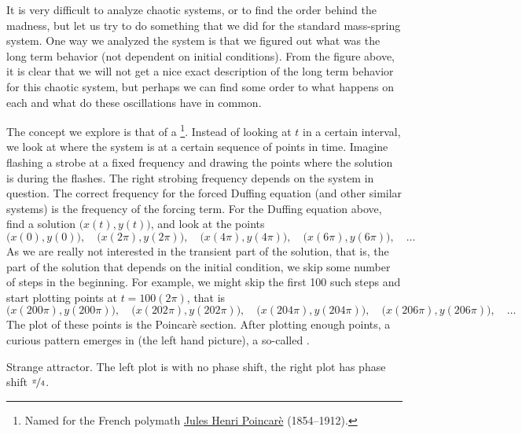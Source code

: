 It is very difficult to analyze chaotic systems, or to find the
order behind the madness, but let us try to do something that we did for
the standard mass-spring system.  One way we analyzed
the system is that we figured out what was the long term behavior (not
dependent on initial conditions).  From the figure above, it is clear
that we will not get a nice exact description of the long term behavior
for this chaotic system, but
perhaps we can find some order to what happens on each
and what do these oscillations have in common.

The concept we explore
is that of a \emph{}%
\footnote{Named for the French polymath
\href{https://en.wikipedia.org/wiki/Henri_Poincar\%C3\%A9}{Jules Henri
Poincar\`e} (1854--1912).}.  Instead of 
looking at $t$ in a certain interval, we look at where the
system is at a certain sequence of points in time.
Imagine flashing a strobe at a
fixed frequency and drawing the points where the solution is during the flashes.
The right strobing frequency
depends on the system in question.
The
correct frequency for the forced Duffing equation (and other similar
systems) is the frequency of the forcing term.
For the Duffing equation above, find a solution
$\bigl(x(t),y(t)\bigr)$, and look at the points
\begin{equation*}
\bigl(x(0),y(0)\bigr), \quad
\bigl(x(2\pi),y(2\pi)\bigr), \quad
\bigl(x(4\pi),y(4\pi)\bigr), \quad
\bigl(x(6\pi),y(6\pi)\bigr), \quad \ldots
\end{equation*}
As we are really not interested in the transient part of the solution, that
is, the part of the solution that depends on the initial condition, we 
skip some number of steps in the beginning.  For example, we might skip the first 100 such
steps and start plotting points at $t = 100(2\pi)$, that is
\begin{equation*}
\bigl(x(200\pi),y(200\pi)\bigr), \quad
\bigl(x(202\pi),y(202\pi)\bigr), \quad
\bigl(x(204\pi),y(204\pi)\bigr), \quad
\bigl(x(206\pi),y(206\pi)\bigr), \quad \ldots
\end{equation*}
The plot of these points is the Poincar\`e section.
After plotting enough points, a curious pattern emerges in
 (the left hand picture), a so-called
\emph{}.

\begin{myfig}
\capstart
\caption{Strange attractor.  The left plot 
is with no phase shift, the right plot has phase shift
$\nicefrac{\pi}{4}$. \label{nlin:strange}}
\end{myfig}

